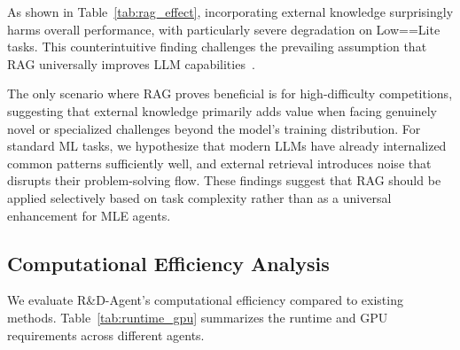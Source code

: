 As shown in Table~\ref{tab:rag_effect}, incorporating external knowledge surprisingly harms overall performance, with particularly severe degradation on Low==Lite tasks. This counterintuitive finding challenges the prevailing assumption that RAG universally improves LLM capabilities~\citep{mansurova2024qa,liang2025kag}. 

The only scenario where RAG proves beneficial is for high-difficulty competitions, suggesting that external knowledge primarily adds value when facing genuinely novel or specialized challenges beyond the model's training distribution. For standard ML tasks, we hypothesize that modern LLMs have already internalized common patterns sufficiently well, and external retrieval introduces noise that disrupts their problem-solving flow. These findings suggest that RAG should be applied selectively based on task complexity rather than as a universal enhancement for MLE agents.

\subsection{Computational Efficiency Analysis}
\label{app:resource}

We evaluate R\&D-Agent's computational efficiency compared to existing methods. Table~\ref{tab:runtime_gpu} summarizes the runtime and GPU requirements across different agents.

